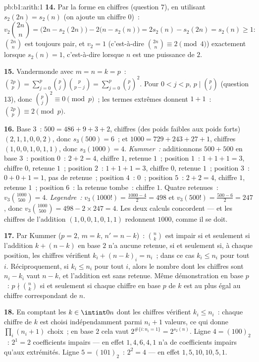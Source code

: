 \begin{solution}{pb:b1:arith:1}
\textbf{14.} Par la forme en chiffres (question 7), en utilisant $s_2(2n) =
s_2(n)$ (on ajoute un chiffre $0$)~:
\[
v_2\binom{2n}n = \bigl(2n - s_2(2n)\bigr) - 2\bigl(n -
s_2(n)\bigr) = 2s_2(n) - s_2(2n) = s_2(n) \geq 1 :
\]
$\binom{2n}n$ est toujours pair, et $v_2 = 1$ (c'est-à-dire $\binom{2n}n
\equiv 2 \pmod 4$) exactement lorsque $s_2(n) = 1$, c'est-à-dire lorsque $n$ est une
puissance de $2$.

\textbf{15.} Vandermonde avec $m = n = k = p$~: $\binom{2p}p =
\sum_{j=0}^p \binom pj\binom p{p-j} = \sum_{j=0}^p \binom pj^2$.
Pour $0 < j < p$, $p \mid \binom pj$ (question 13), donc $\binom
pj^2 \equiv 0 \pmod p$~; les termes extrêmes donnent $1 + 1$~:
$\binom{2p}p \equiv 2 \pmod p$.

\textbf{16.} Base $3$~: $500 = 486 + 9 + 3 + 2$, chiffres (des poids faibles aux
poids forts) $(2, 1, 1, 0, 0, 2)$, donc $s_3(500) = 6$~; et $1000 = 729 +
243 + 27 + 1$, chiffres $(1, 0, 0, 1, 0, 1, 1)$, donc $s_3(1000) = 4$.
\emph{Kummer~:} additionnons $500 + 500$ en base $3$~: position $0$~: $2 + 2 =
4$, chiffre $1$, retenue $1$~; position $1$~: $1 + 1 + 1 = 3$, chiffre $0$,
retenue $1$~; position $2$~: $1 + 1 + 1 = 3$, chiffre $0$, retenue $1$~;
position $3$~: $0 + 0 + 1 = 1$, pas de retenue~; position $4$~: $0$~;
position $5$~: $2 + 2 = 4$, chiffre $1$, retenue $1$~; position $6$~:
la retenue tombe~: chiffre $1$. Quatre retenues~: $v_3\binom{1000}{500} = 4$.
\emph{Legendre~:} $v_3(1000!) = \frac{1000 - 4}2 = 498$ et
$v_3(500!) = \frac{500 - 6}2 = 247$, donc $v_3\binom{1000}{500} =
498 - 2\times247 = 4$. Les deux calculs concordent --- et les chiffres de
l'addition $(1, 0, 0, 1, 0, 1, 1)$ redonnent $1000$, comme il se
doit.

\textbf{17.} Par Kummer ($p = 2$, $m = k$, $n' = n - k$)~:
$\binom nk$ est impair si et seulement si l'addition $k + (n - k)$ en base $2$ n'a
aucune retenue, si et seulement si, à chaque position, les chiffres vérifient $k_i + (n -
k)_i = n_i$~; dans ce cas $k_i \leq n_i$ pour tout $i$. Réciproquement,
si $k_i \leq n_i$ pour tout $i$, alors le nombre dont les chiffres sont $n_i -
k_i$ vaut $n - k$, et l'addition est sans retenue. Même démonstration en base
$p$~: $p \nmid \binom nk$ si et seulement si chaque chiffre en base $p$ de $k$ est au
plus égal au chiffre correspondant de $n$.

\textbf{18.} En comptant les $k \in \intint0n$ dont les chiffres vérifient
$k_i \leq n_i$~: chaque chiffre de $k$ est choisi indépendamment parmi
$n_i + 1$ valeurs, ce qui donne $\prod_i (n_i + 1)$ choix~; en base $2$
cela vaut $2^{\#\{i : n_i = 1\}} = 2^{s_2(n)}$. Ligne $4 =
(100)_2$~: $2^1 = 2$ coefficients impairs --- en effet $1, 4, 6, 4, 1$ n'a de
coefficients impairs qu'aux extrémités. Ligne $5 = (101)_2$~: $2^2 = 4$ --- en effet
$1, 5, 10, 10, 5, 1$.


\end{solution}
